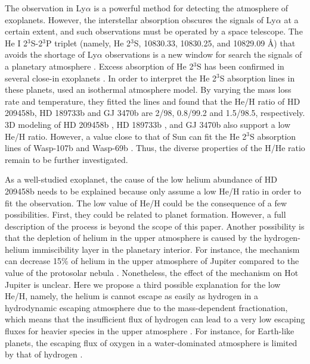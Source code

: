 \documentclass[journal, onecolumn]{aastex631}
\begin{document}
\begin{CJK*}{UTF8}{gbsn}
The observation in Ly$\alpha$ is a powerful method for detecting the atmosphere of exoplanets. However, the interstellar absorption obscures the signals of Ly$\alpha$ at a certain extent, and such observations must be operated by a space telescope. The He I 2$^3$S-2$^3$P triplet (namely, He 2$^3$S, 10830.33, 10830.25, and 10829.09 \AA) that avoids the shortage of Ly$\alpha$ observations \citep{Indriolo2009} is a new window for search the signals of a planetary atmosphere \citep{Seager2000, Oklopcic2018}. Excess absorption of He 2$^3$S has been confirmed in several close-in exoplanets \citep{Allart2018,Spake2018,Alonso2019,Czesla2022}. In order to interpret the He 2$^3$S absorption lines in these planets, \cite{Lampon2020, Lampon2021} used an isothermal atmosphere model. By varying the mass loss rate and temperature, they fitted the lines and found that the He/H ratio of HD 209458b, HD 189733b and GJ 3470b are 2/98, 0.8/99.2 and 1.5/98.5, respectively. 3D modeling of HD 209458b \citep{Khodachenko2021_0}, HD 189733b \citep{Rumenskikh2022}, and GJ 3470b \citep{Shaikhislamov2021} also support a low He/H ratio. However, a value close to that of Sun can fit the He 2$^3$S absorption lines of Wasp-107b \citep{Khodachenko2021_1, Wang2021_1} and Wasp-69b \citep{Wang2021_0}. Thus, the diverse properties of the H/He ratio remain to be further investigated.

As a well-studied exoplanet, the cause of the low helium abundance of HD 209458b needs to be explained because \cite{Lampon2020} only assume a low He/H ratio in order to fit the observation. The low value of He/H could be the consequence of a few possibilities. First, they could be related to planet formation. However, a full description of the process is beyond the scope of this paper. Another possibility is that the depletion of helium in the upper atmosphere is caused by the hydrogen-helium immiscibility layer in the planetary interior. For instance, the mechanism can decrease 15\% of helium in the upper atmosphere of Jupiter compared to the value of the protosolar nebula \citep{Wilson2010}. Nonetheless, the effect of the mechanism on Hot Jupiter is unclear. Here we propose a third possible explanation for the low He/H, namely, the helium is cannot escape as easily as hydrogen in a hydrodynamic escaping atmosphere due to the mass-dependent fractionation, which means that the insufficient flux of hydrogen can lead to a very low escaping fluxes for heavier species in the upper atmosphere \citep{Hunten1987}. For instance, for Earth-like planets, the escaping flux of oxygen in a water-dominated atmosphere is limited by that of hydrogen \citep{Guo2019}.


\end{CJK*}
\end{document}

